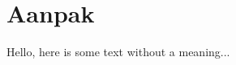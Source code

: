 \documentclass[../DCM2_Verslag.tex]{subfiles}
\begin{document}
\section{Aanpak}



Hello, here is some text without a meaning...
\end{document}
